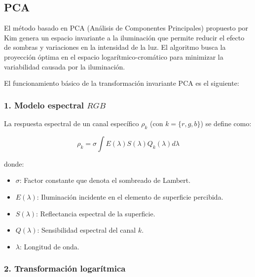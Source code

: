 \subsection{PCA}\label{pca}
El método basado en PCA (Análisis de Componentes Principales) \cite{pca2017} propuesto por Kim genera un espacio invariante a la iluminación que permite reducir el efecto de sombras y variaciones en la intensidad de la luz. El algoritmo busca la proyección óptima en el espacio logarítmico-cromático para minimizar la variabilidad causada por la iluminación.

El funcionamiento básico de la transformación invariante PCA es el siguiente:

\subsubsection{1. Modelo espectral $RGB$}

La respuesta espectral de un canal específico $\rho_k$ (con $k=\{r,g,b\}$) se define como:

$$\rho_k =\sigma \int E(\lambda )S(\lambda )Q_k (\lambda )d\lambda$$

donde:

\begin{itemize}
\setlength{\itemsep}{-1ex}
   \item{\begin{flushleft} $\sigma$: Factor constante que denota el sombreado de Lambert. \end{flushleft}}
   \item{\begin{flushleft} $E(\lambda )$: Iluminación incidente en el elemento de superficie percibida. \end{flushleft}}
   \item{\begin{flushleft} $S(\lambda )$: Reflectancia espectral de la superficie. \end{flushleft}}
   \item{\begin{flushleft} $Q(\lambda )$: Sensibilidad espectral del canal $k$. \end{flushleft}}
   \item{\begin{flushleft} $\lambda$: Longitud de onda. \end{flushleft}}
\end{itemize}

\subsubsection{2. Transformación logarítmica}

